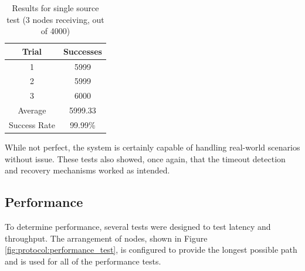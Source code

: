 \begin{table}
	\begin{center}
		\setlength{\extrarowheight}{1.5pt}
		\caption{Results for single source test (3 nodes receiving, out of 4000)}
		\vspace{0.1cm}
		\begin{tabular} {|c|c|}
			\hline
			\textbf{Trial} & \textbf{Successes} \\
			\hline
			\hline
			1 & 5999 \\
			\hline
			2 & 5999 \\
			\hline
			3 & 6000 \\
			\hline
			\hline
			Average & 5999.33 \\
			\hline
			Success Rate & 99.99\% \\
			\hline
		\end{tabular}
		\label{tab:protocol:3_line_flood_test}
	\end{center}
\end{table}

While not perfect, the system is certainly capable of handling real-world scenarios without issue. These tests also showed, once again, that the timeout detection and recovery mechanisms worked as intended.

\subsection{Performance}\label{sec:protocol:results:performance}

To determine performance, several tests were designed to test latency and throughput. The arrangement of nodes, shown in Figure \ref{fig:protocol:performance_test}, is configured to provide the longest possible path and is used for all of the performance tests.

